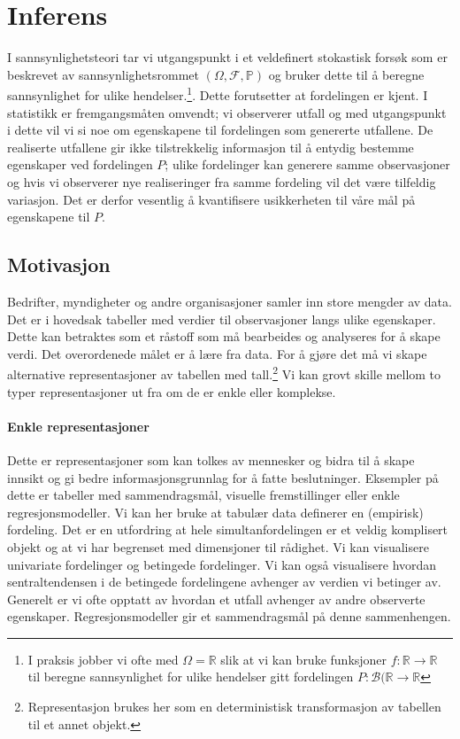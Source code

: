 \chapter{Inferens}
I sannsynlighetsteori tar vi utgangspunkt i et veldefinert stokastisk forsøk som er beskrevet av sannsynlighetsrommet $(\Omega, \mathscr{F},\mathbb{P})$ og bruker dette til å beregne sannsynlighet for ulike hendelser.\footnote{I praksis jobber vi ofte med $\Omega = \mathbb{R}$ slik at vi kan bruke funksjoner $f:\mathbb{R}\to\mathbb{R}$ til beregne sannsynlighet for ulike hendelser gitt fordelingen $P:\mathcal{B}(\mathbb{R}\to\mathbb{R}$}. Dette forutsetter at fordelingen er kjent. I statistikk er fremgangsmåten omvendt; vi observerer utfall og med utgangspunkt i dette vil vi si noe om egenskapene til fordelingen som genererte utfallene. De realiserte utfallene gir ikke tilstrekkelig informasjon til å entydig bestemme egenskaper ved fordelingen $P$; ulike fordelinger kan generere samme observasjoner og hvis vi observerer nye realiseringer fra samme fordeling vil det være tilfeldig variasjon. Det er derfor vesentlig å kvantifisere usikkerheten til våre mål på egenskapene til $P$.
\section{Motivasjon}
Bedrifter, myndigheter og andre organisasjoner samler inn store mengder av data. Det er i hovedsak tabeller med verdier til observasjoner langs ulike egenskaper. Dette kan betraktes som et råstoff som må bearbeides og analyseres for å skape verdi. Det overordenede målet er å lære fra data. For å gjøre det må vi skape alternative representasjoner av tabellen med tall.\footnote{Representasjon brukes her som en deterministisk transformasjon av tabellen til et annet objekt.} Vi kan grovt skille mellom to typer representasjoner ut fra om de er enkle eller komplekse.
\subsubsection{Enkle representasjoner}
Dette er representasjoner som kan tolkes av mennesker og bidra til å skape innsikt og gi bedre informasjonsgrunnlag for å fatte beslutninger. Eksempler på dette er tabeller med sammendragsmål, visuelle fremstillinger eller enkle regresjonsmodeller. Vi kan her bruke at tabulær data definerer en (empirisk) fordeling. Det er en utfordring at hele simultanfordelingen er et veldig komplisert objekt og at vi har begrenset med dimensjoner til rådighet. Vi kan visualisere univariate fordelinger og betingede fordelinger. Vi kan også visualisere hvordan sentraltendensen i de betingede fordelingene avhenger av verdien vi betinger av. Generelt er vi ofte opptatt av hvordan et utfall avhenger av andre observerte egenskaper. Regresjonsmodeller gir et sammendragsmål på denne sammenhengen.
